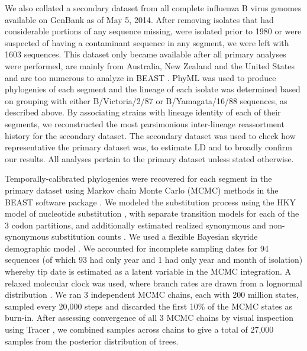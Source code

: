 \documentclass[11pt,oneside,letterpaper]{article}
\begin{document}
We also collated a secondary dataset from all complete influenza B virus genomes available on GenBank as of May 5, 2014.
After removing isolates that had considerable portions of any sequence missing, were isolated prior to 1980 or were suspected of having a contaminant sequence in any segment, we were left with 1603 sequences.
This dataset only became available after all primary analyses were performed, are mainly from Australia, New Zealand and the United States and are too numerous to analyze in BEAST \citep{drummond2012}.
PhyML \citep{guindon2003} was used to produce phylogenies of each segment and the lineage of each isolate was determined based on grouping with either B/Victoria/2/87 or B/Yamagata/16/88 sequences, as described above.
By associating strains with lineage identity of each of their segments, we reconstructed the most parsimonious inter-lineage reassortment history for the secondary dataset.
The secondary dataset was used to check how representative the primary dataset was, to estimate LD and to broadly confirm our results.
All analyses pertain to the primary dataset unless stated otherwise.

Temporally-calibrated phylogenies were recovered for each segment in the primary dataset using Markov chain Monte Carlo (MCMC) methods in the BEAST software package \citep{drummond2012}.
We modeled the substitution process using the HKY model of nucleotide substitution \citep{hky1985}, with separate transition models for each of the 3 codon partitions, and additionally estimated realized synonymous and non-synonymous substitution counts \citep{obrien2009}.
We used a flexible Bayesian skyride demographic model \citep{minin2008}.
We accounted for incomplete sampling dates for 94 sequences (of which 93 had only year and 1 had only year and month of isolation) whereby tip date is estimated as a latent variable in the MCMC integration.
A relaxed molecular clock was used, where branch rates are drawn from a lognormal distribution \citep{drummond2006}.
We ran 3 independent MCMC chains, each with 200 million states, sampled every 20,000 steps and discarded the first 10\% of the MCMC states as burn-in.
After assessing convergence of all 3 MCMC chains by visual inspection using Tracer \citep{tracer}, we combined samples across chains to give a total of 27,000 samples from the posterior distribution of trees.
\end{document}
